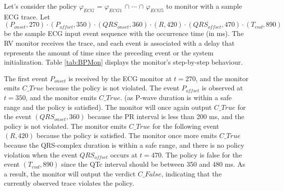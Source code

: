 \begin{example}
	Let's consider the policy $\varphi_{ECG}$ = $\varphi_{ECG1}$ $\cap$ $\cdots$ $\cap$ $\varphi_{ECG5}$ to monitor with a sample ECG trace. Let $(P_{onset},270)\cdot(P_{offset},350)\cdot(QRS_{onset},360)\cdot(R,420) \cdot (QRS_{offset}, 470) \cdot (T_{end}, 890)$ be the sample ECG input event sequence with the occurrence time (in ms). The RV monitor receives the trace, and each event is associated with a delay that represents the amount of time since the preceding event or the system initialization. Table \ref{tab:BPMon} displays the monitor's step-by-step behaviour.
	
	The first event $P_{onset}$ is received by the ECG monitor at $t=270$, and the monitor emits $C\_True$ because the policy is not violated. The event $P_{offset}$ is observed at $t=350$, and the monitor emits $C\_True$. (as P-wave duration is within a safe range and the policy is satisfied). The monitor will once again output $C\_True$ for the event $(QRS_{onset},360)$ because the PR interval is less than 200 ms, and the policy is not violated. The monitor emits $C\_True$ for the following event $(R,420)$ because the policy is satisfied. The monitor once more emits $C\_True$ because the QRS-complex duration is within a safe range, and there is no policy violation when the event $QRS_{offset}$ occurs at $t=470$. The policy is false for the event $(T_{end}, 890)$ since the QTc interval should be between 350 and 480 ms. As a result, the monitor will output the verdict $C\_False$, indicating that the currently observed trace violates the policy.
\end{example}	
